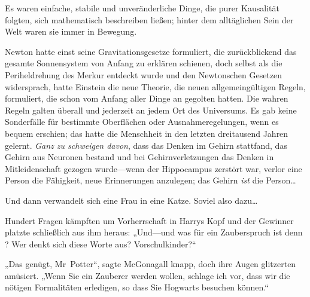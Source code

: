 Es waren einfache, stabile und unveränderliche Dinge, die purer Kausalität folgten, sich mathematisch beschreiben ließen; hinter dem alltäglichen Sein der Welt waren sie immer in Bewegung.

Newton hatte einst seine Gravitationsgesetze formuliert, die zurückblickend das gesamte Sonnensystem von Anfang zu erklären schienen, doch selbst als die Periheldrehung des Merkur entdeckt wurde und den Newtonschen Gesetzen widersprach, hatte Einstein die neue Theorie, die neuen allgemeingültigen Regeln, formuliert, die schon vom Anfang aller Dinge an gegolten hatten. Die wahren Regeln galten überall und jederzeit an jedem Ort des Universums. Es gab keine Sonderfälle für bestimmte Oberflächen oder Ausnahmeregelungen, wenn es bequem erschien; das hatte die Menschheit in den letzten dreitausend Jahren gelernt. \emph{Ganz zu schweigen davon}, dass das Denken im Gehirn stattfand, das Gehirn aus Neuronen bestand und bei Gehirnverletzungen das Denken in Mitleidenschaft gezogen wurde—wenn der Hippocampus zerstört war, verlor eine Person die Fähigkeit, neue Erinnerungen anzulegen; das Gehirn \emph{ist} die Person…

Und dann verwandelt sich eine Frau in eine Katze. Soviel also dazu…

Hundert Fragen kämpften um Vorherrschaft in Harrys Kopf und der Gewinner platzte schließlich aus ihm heraus: „Und—und was für ein Zauberspruch ist denn ? Wer denkt sich diese Worte aus? Vorschulkinder?“

„Das genügt, Mr~Potter“, sagte McGonagall knapp, doch ihre Augen glitzerten amüsiert. „Wenn Sie ein Zauberer werden wollen, schlage ich vor, dass wir die nötigen Formalitäten erledigen, so dass Sie Hogwarts besuchen können.“

